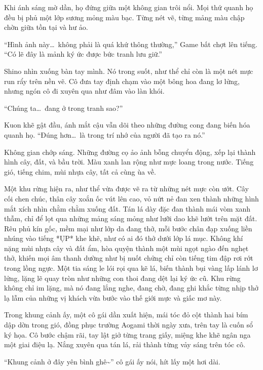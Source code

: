 \documentclass[../main.tex]{subfiles}
\begin{document}
Khi ánh sáng mờ dần, họ đứng giữa một không gian trôi nổi. Mọi thứ quanh họ đều bị phủ một lớp sương mỏng màu bạc. Từng nét vẽ, từng mảng màu chập chờn giữa tồn tại và hư ảo.

``Hình ảnh này\dots\ không phải là quá khứ thông thường,'' Game bất chợt lên tiếng. ``Có lẽ đây là mảnh ký ức được bức tranh lưu giữ.''

Shino nhìn xuống bàn tay mình. Nó trong suốt, như thể chỉ còn là một nét mực run rẩy trên nền vẽ. Cô đưa tay định chạm vào một bông hoa đang lơ lửng, nhưng ngón cô đi xuyên qua như đâm vào làn khói.

``Chúng ta\dots\ đang ở trong tranh sao?''

Kuon khẽ gật đầu, ánh mắt cậu vẫn dõi theo những đường cong đang biến hóa quanh họ. ``Đúng hơn\dots\ là trong trí nhớ của người đã tạo ra nó.''

Không gian chớp sáng. Những đường cọ ảo ảnh bỗng chuyển động, xếp lại thành hình cây, đất, và bầu trời. Màu xanh lan rộng như mực loang trong nước. Tiếng gió, tiếng chim, mùi nhựa cây, tất cả cùng ùa về.


Một khu rừng hiện ra, như thể vừa được vẽ ra từ những nét mực còn ướt. Cây cối chen chúc, thân cây xoắn ốc vút lên cao, vỏ nứt nẻ đan xen thành những hình mắt xích nhìn chằm chằm xuống đất. Tán lá dày đặc đan thành mái vòm xanh thẫm, chỉ để lọt qua những mảng sáng mỏng như lưỡi dao khẽ lướt trên mặt đất. Rêu phủ kín gốc, mềm mại như lớp da đang thở, mỗi bước chân đạp xuống liền nhúng vào tiếng *ỤP* khe khẽ, như có ai đó thở dưới lớp lá mục. Không khí nặng mùi nhựa cây và đất ẩm, hòa quyện thành một mùi ngọt ngào đến nghẹt thở, khiến mọi âm thanh dường như bị nuốt chửng chỉ còn tiếng tim đập rơi rớt trong lồng ngực. Một tia sáng le lói rọi qua kẽ lá, biến thành bụi vàng lấp lánh lơ lửng, lặng lẽ quay tròn như những con thoi đang dệt lại ký ức cũ. Khu rừng không chỉ im lặng, mà nó đang lắng nghe, đang chờ, đang ghi khắc từng nhịp thở lạ lẫm của những vị khách vừa bước vào thế giới mực và giấc mơ này.

Trong khung cảnh ấy, một cô gái dần xuất hiện, mái tóc đỏ cột thành hai bím dập dờn trong gió, đồng phục trường Aogami thời ngày xưa, trên tay là cuốn sổ ký họa. Cô bước chậm rãi, tay lật giở từng trang giấy, miệng khe khẽ ngân nga một giai điệu lạ. Nắng xuyên qua tán lá, rải thành từng vảy sáng trên tóc cô.


``Khung cảnh ở đây yên bình ghê\~{}'' cô gái ấy nói, hít lấy một hơi dài.
\end{document}
